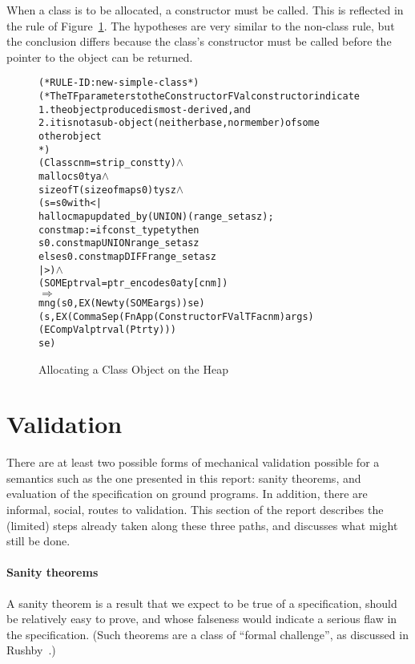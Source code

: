\documentclass[11pt]{article}
\begin{document}
When a class is to be allocated, a constructor must be called.  This
is reflected in the rule of Figure~\ref{fig:new-simple-class}.   The
hypotheses are very similar to the non-class rule, but the conclusion
differs because the class's constructor must be called before the
pointer to the object can be returned.
\begin{figure}[htbp]
\begin{center}
\begin{minipage}{\textwidth}
\begin{alltt}
(* RULE-ID: new-simple-class *)
(* The T F parameters to the ConstructorFVal constructor indicate
    1. the object produced is most-derived, and
    2. it is not a sub-object (neither base, nor member) of some
       other object
*)
     (Class cnm = strip_const ty) \(\land\)
     malloc s0 ty a \(\land\)
     sizeof T (sizeofmap s0) ty sz \(\land\)
     (s = s0 with <|
             hallocmap updated_by (UNION) (range_set a sz) ;
             constmap := if const_type ty then
                           s0.constmap UNION range_set a sz
                         else s0.constmap DIFF range_set a sz
          |>) \(\land\)
     (SOME ptrval = ptr_encode s0 a ty [cnm])
   \(\Rightarrow\)
     mng (s0, EX (New ty (SOME args)) se)
         (s, EX (CommaSep (FnApp (ConstructorFVal T F a cnm) args)
                          (ECompVal ptrval (Ptr ty)))
                se)
\end{alltt}
\end{minipage}
\end{center}
\caption{Allocating a Class Object on the Heap}
\label{fig:new-simple-class}
\end{figure}

\section{Validation}
\label{sec:validation}

There are at least two possible forms of mechanical validation
possible for a semantics such as the one presented in this report:
sanity theorems, and evaluation of the specification on ground
programs.  In addition, there are informal, social, routes to
validation.  This section of the report describes the (limited) steps
already taken along these three paths, and discusses what might still
be done.

\paragraph{Sanity theorems}
 A sanity theorem is a result that we expect to
be true of a specification, should be relatively easy to prove, and
whose falseness would indicate a serious flaw in the specification.
(Such theorems are a class of ``formal challenge'', as discussed in
Rushby~\cite{Rushby93}.)
\end{document}
